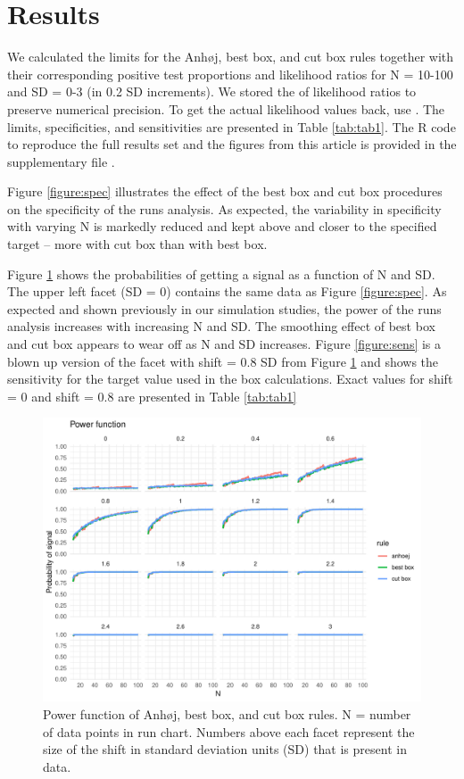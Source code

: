 \hypertarget{results}{%
\section{Results}\label{results}}

We calculated the limits for the Anhøj, best box, and cut box rules
together with their corresponding positive test proportions and
likelihood ratios for N = 10-100 and SD = 0-3 (in 0.2 SD increments). We
stored the  of likelihood ratios to preserve numerical
precision. To get the actual likelihood values back, use
. The limits, specificities, and sensitivities
are presented in Table \ref{tab:tab1}. The R code to reproduce the full
results set and the figures from this article is provided in the
supplementary file .

Figure \ref{figure:spec} illustrates the effect of the best box and cut
box procedures on the specificity of the runs analysis. As expected, the
variability in specificity with varying N is markedly reduced and kept
above and closer to the specified target -- more with cut box than with
best box.

Figure \ref{figure:pwr} shows the probabilities of getting a signal as a
function of N and SD. The upper left facet (SD = 0) contains the same
data as Figure \ref{figure:spec}. As expected and shown previously in
our simulation studies, the power of the runs analysis increases with
increasing N and SD. The smoothing effect of best box and cut box
appears to wear off as N and SD increases. Figure \ref{figure:sens} is a
blown up version of the facet with shift = 0.8 SD from Figure
\ref{figure:pwr} and shows the sensitivity for the target value used in
the box calculations. Exact values for shift = 0 and shift = 0.8 are
presented in Table \ref{tab:tab1}

\begin{figure}[htbp]
  \centering
  \includegraphics[width=\textwidth]{fig_pwr.pdf}
  \caption{Power function of Anhøj, best box, and cut box rules.
           N = number of data points in run chart.
           Numbers above each facet represent the size of the shift in standard
           deviation units (SD) that is present in data.}
  \label{figure:pwr}
\end{figure}

